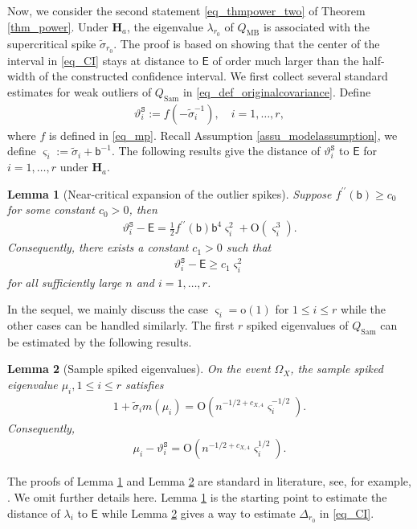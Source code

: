 \documentclass[12pt]{article}
\theoremstyle{plain}
\newtheorem{lemma}{Lemma}[section]
\numberwithin{equation}{section}
\begin{document}
Now, we consider the second statement \eqref{eq_thmpower_two} of Theorem \ref{thm_power}.
Under $\mathbf{H}_a$, the eigenvalue $\lambda_{r_0}$ of $Q_{\mathrm{MB}}$ is associated with the supercritical spike $\widetilde{\sigma}_{r_0}$. The proof is based on showing that the center of the interval in \eqref{eq_CI} stays at distance to $\mathsf E$ of order much larger than the half-width of the constructed confidence interval. We first collect several standard estimates for weak outliers of $Q_{\mathrm{Sam}}$ in \eqref{eq_def_originalcovariance}. Define
\begin{align}\label{eq_def_vartheta_S}
	\vartheta_i^{\mathtt{S}}:=f(-\widetilde{\sigma}_i^{-1}),\quad i=1,\dots, r,
\end{align}
where $f$ is defined in \eqref{eq_mp}. Recall Assumption \ref{assu_modelassumption}, we define $\varsigma_i:=\widetilde{\sigma}_i+\mathsf{b}^{-1}$. The following results give the distance of $\vartheta_i^{\mathtt{S}}$ to $\mathsf{E}$ for $i=1,\dots, r$ under $\mathbf{H}_a$.
\begin{lemma}[Near-critical expansion of the outlier spikes]\label{lem_power_outlier_expansion}
	Suppose $f^{\prime\prime}(\mathsf{b})\ge c_0$ for some constant $c_0>0$, then
	\begin{align}\label{eq_power_outlier_expansion}
		\vartheta_i^{\mathtt{S}}-\mathsf{E}
		=\frac{1}{2} f^{\prime\prime}(\mathsf{b})\mathsf b^4\varsigma_i^2+\mathrm{O}(\varsigma_i^3).
	\end{align}
	Consequently, there exists a constant $c_1>0$ such that
	\begin{align}\label{eq_power_outlier_lower}
		\vartheta_i^{\mathtt{S}}-\mathsf{E}\ge c_1\varsigma_i^2
	\end{align}
	for all sufficiently large $n$ and $i=1,\dots, r$.
\end{lemma}
In the sequel, we mainly discuss the case $\varsigma_i=\mathrm{o}(1)$ for $1\le i\le r$ while the other cases can be handled similarly. The first $r$ spiked eigenvalues of $Q_{\mathrm{Sam}}$ can be estimated by the following results.
\begin{lemma}[Sample spiked eigenvalues]\label{lem_power_sample_localization}
	On the event $\Omega_X$, the sample spiked eigenvalue $\mu_i, 1\le i\le r$ satisfies
	\begin{align}\label{eq_power_sample_secular}
		1+\widetilde{\sigma}_i m(\mu_i)=\mathrm{O}\left(n^{-1/2+c_{X,4}}\varsigma_i^{-1/2}\right).
	\end{align}
	Consequently,
	\begin{align}\label{eq_power_sample_localization}
		\mu_i-\vartheta_i^{\mathtt{S}}
		=\mathrm{O}\left(n^{-1/2+c_{X,4}}\varsigma_i^{1/2}\right).
	\end{align}
\end{lemma}
The proofs of Lemma \ref{lem_power_outlier_expansion} and Lemma \ref{lem_power_sample_localization} are standard  in literature, see, for example, \citep{ding2021spiked,ding2024eigenvector}. We omit further details here. Lemma \ref{lem_power_outlier_expansion} is the starting point to estimate the distance of $\lambda_i$ to $\mathsf{E}$ while Lemma \ref{lem_power_sample_localization} gives a way to estimate $\Delta_{r_0}$ in \eqref{eq_CI}.
\end{document}
